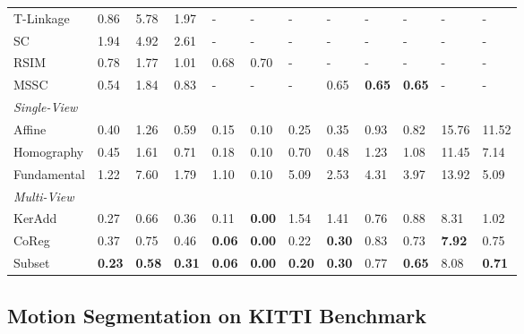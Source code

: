 \documentclass[10pt,twocolumn,letterpaper]{article}
\begin{document}
\begin{table*}[htbp]
{\begin{tabular}{llllllllllll}
    \multicolumn{1}{l}{T-Linkage \cite{Magri2014}} & 0.86  & 5.78  & 1.97  & -     & -     & -     & -     & -     & - & - & - \\
    SC  \cite{Li2015} & 1.94  & 4.92  & 2.61  & -     & -     & -     & -     & -     & - & - & - \\
    RSIM \cite{Ji2016} & 0.78 & 1.77 & 1.01 & 0.68 & 0.70 & - & - & - & - & - & - \\
    \multicolumn{1}{l}{MSSC \cite{Lai2017}} & 0.54  & 1.84  & 0.83  & -     & -     & -     & 0.65  & \textbf{0.65}  & \textbf{0.65} & - & - \\
    \midrule
    \textit{Single-View} & \multicolumn{11}{l}{} \\
    \midrule
    Affine & 0.40  & 1.26  & 0.59  & 0.15  & {0.10} &   0.25   & 0.35  & 0.93  & 0.82 & 15.76 & 11.52 \\
    Homography & 0.45  & 1.61  & 0.71  & 0.18  & {0.10} &   0.70   & 0.48  & 1.23  & 1.08 & 11.45 & 7.14 \\
    Fundamental & 1.22  & 7.60  & 1.79  & 1.10  & {0.10} &   5.09  & 2.53  & 4.31  & 3.97 & 13.92 & 5.09 \\
    \midrule
    \textit{\small{Multi-View}} & \multicolumn{11}{l}{} \\
    \midrule
    KerAdd & {0.27} & {0.66}  & 0.36  & {0.11} & \textbf{0.00} &  1.54   & 1.41  & 0.76  & 0.88 & 8.31 & 1.02 \\
    CoReg & 0.37  & {0.75} & {0.46} &   \textbf{0.06}  &  \textbf{0.00}     &   {0.22}   & \textbf{0.30} & {0.83} & {0.73} & \textbf{7.92} & {0.75} \\
     Subset & \textbf{0.23}  & \textbf{0.58} & \textbf{0.31} &   \textbf{0.06}  &  \textbf{0.00}     &   \textbf{0.20}   & \textbf{0.30} & {0.77} & \textbf{0.65} & {8.08} & \textbf{0.71} \\
    \bottomrule
    \end{tabular}}\vspace{-0.2cm}
  \label{tab:AllPerf}\end{table*}


\subsection{Motion Segmentation on KITTI Benchmark}
\end{document}

